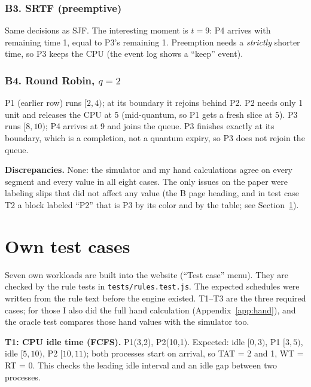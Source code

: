 \documentclass[11pt,a4paper]{article}
\begin{document}
\subsubsection*{B3. SRTF (preemptive)}
Same decisions as SJF. The interesting moment is $t=9$: P4 arrives with remaining time 1, equal to P3's remaining 1.
Preemption needs a \emph{strictly} shorter time, so P3 keeps the CPU (the event log shows a ``keep'' event).


\subsubsection*{B4. Round Robin, $q=2$}
P1 (earlier row) runs $[2,4)$; at its boundary it rejoins behind P2. P2 needs only 1 unit and releases the CPU at 5
(mid-quantum, so P1 gets a fresh slice at 5). P3 runs $[8,10)$; P4 arrives at 9 and joins the queue. P3 finishes exactly
at its boundary, which is a completion, not a quantum expiry, so P3 does not rejoin the queue.


\textbf{Discrepancies.} None: the simulator and my hand calculations agree on every segment and every value in all
eight cases. The only issues on the paper were labeling slips that did not affect any value (the B page heading, and in
test case T2 a block labeled ``P2'' that is P3 by its color and by the table; see Section~\ref{sec:tests}).

\section{Own test cases}\label{sec:tests}

Seven own workloads are built into the website (``Test case'' menu). They are checked by the rule tests in
\texttt{tests/rules.test.js}. The expected schedules were written from the rule text before the engine existed. T1--T3 are the three required cases;
for those I also did the full hand calculation (Appendix~\ref{app:hand}), and the oracle test compares those hand
values with the simulator too.

\begin{center}\small\end{center}

\textbf{T1: CPU idle time (FCFS).} P1(3,2), P2(10,1). Expected: idle $[0,3)$, P1 $[3,5)$, idle $[5,10)$, P2 $[10,11)$;
both processes start on arrival, so TAT = 2 and 1, WT = RT = 0. This checks the leading idle interval and an idle gap
between two processes.
\begin{center}\end{center}
\end{document}

